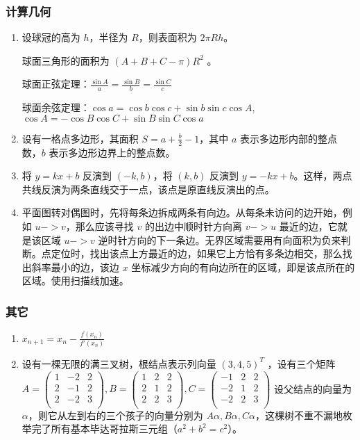 \subsubsection{计算几何}

\begin{enumerate}

\item 设球冠的高为 $h$，半径为 $R$，则表面积为 $2\pi Rh$。

球面三角形的面积为 $(A+B+C-\pi)R^{2}$ 。

球面正弦定理：$\frac{\sin A}{a} = \frac{\sin B}{b} = \frac{\sin C}{c}$

球面余弦定理：$\cos a=\cos b\cos c+\sin b\sin c\cos A$, $\cos A=-\cos B\cos C+\sin B\sin C\cos a$

\item 设有一格点多边形，其面积 $S=a+\frac{b}{2}-1$，其中 $a$ 表示多边形内部的整点数，$b$ 表示多边形边界上的整点数。

\item 将 $y=kx+b$ 反演到 $(-k,b)$，将 $(k,b)$ 反演到 $y=-kx+b$。这样，两点共线反演为两条直线交于一点，该点是原直线反演出的点。

\item 平面图转对偶图时，先将每条边拆成两条有向边。从每条未访问的边开始，例如 $u->v$，那么应该寻找 $v$ 的出边中顺时针方向离 $v->u$ 最近的边，它就是该区域 $u->v$ 逆时针方向的下一条边。无界区域需要用有向面积为负来判断。点定位时，找出该点上方最近的边，如果它上方恰有多条边相交，那么找出斜率最小的边，该边 $x$ 坐标减少方向的有向边所在的区域，即是该点所在的区域。使用扫描线加速。

\end{enumerate}

\subsubsection{其它}

\begin{enumerate}

\item $x_{n+1}=x_{n}-\frac{f(x_{n})}{f'(x_{n})}$

\item 设有一棵无限的满三叉树，根结点表示列向量 $(3,4,5)^{T}$ ，设有三个矩阵 $
A=\begin{pmatrix}
1&-2&2\\
2&-1&2\\
2&-2&3\\
\end{pmatrix}
,
B=\begin{pmatrix}
1&2&2\\
2&1&2\\
2&2&3\\
\end{pmatrix}
,
C=\begin{pmatrix}
-1&2&2\\
-2&1&2\\
-2&2&3\\
\end{pmatrix}
$ 设父结点的向量为 $\alpha$，则它从左到右的三个孩子的向量分别为 $A\alpha, B\alpha, C\alpha$，这棵树不重不漏地枚举完了所有基本毕达哥拉斯三元组（$a^{2}+b^{2}=c^{2}$）。


\end{enumerate}
